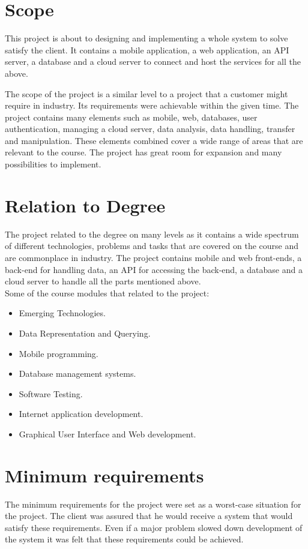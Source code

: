 \section{Scope}
This project is about to designing and implementing a whole system to solve satisfy the client. It contains a mobile application, a web application, an API server, a database and a cloud server to connect and host the services for all the above.

The scope of the project is a similar level to a project that a customer might require in industry. Its requirements were achievable within the given time. The project contains many elements such as mobile, web, databases, user authentication, managing a cloud server, data analysis, data handling, transfer and manipulation. These elements combined cover a wide range of areas that are relevant to the course. The project has great room for expansion and many possibilities to implement.


\section{Relation to Degree}

The project related to the degree on many levels as it contains a wide spectrum of different technologies, problems and tasks that are covered on the course and are commonplace in industry. The project contains mobile and web front-ends, a back-end for handling data, an API for accessing the back-end, a database and a cloud server to handle all the parts mentioned above. \\

Some of the course modules that related to the project:

\begin{itemize}
\item Emerging Technologies.
\item Data Representation and Querying.
\item Mobile programming.
\item Database management systems.
\item Software Testing.
\item Internet application development.
\item Graphical User Interface and Web development.
\end{itemize}
	
\section{Minimum requirements}
The minimum requirements for the project were set as a worst-case situation for the project. The client was assured that he would receive a system that would satisfy these requirements. Even if a major problem slowed down development of the system it was felt that these requirements could be achieved. \\

